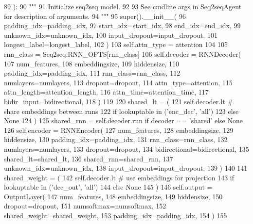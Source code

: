 \begin{DoxyCode}
89     ):
90         \textcolor{stringliteral}{"""}
91 \textcolor{stringliteral}{        Initialize seq2seq model.}
92 \textcolor{stringliteral}{}
93 \textcolor{stringliteral}{        See cmdline args in Seq2seqAgent for description of arguments.}
94 \textcolor{stringliteral}{        """}
95         super().\_\_init\_\_(
96             padding\_idx=padding\_idx,
97             start\_idx=start\_idx,
98             end\_idx=end\_idx,
99             unknown\_idx=unknown\_idx,
100             input\_dropout=input\_dropout,
101             longest\_label=longest\_label,
102         )
103         self.attn\_type = attention
104 
105         rnn\_class = Seq2seq.RNN\_OPTS[rnn\_class]
106         self.decoder = RNNDecoder(
107             num\_features,
108             embeddingsize,
109             hiddensize,
110             padding\_idx=padding\_idx,
111             rnn\_class=rnn\_class,
112             numlayers=numlayers,
113             dropout=dropout,
114             attn\_type=attention,
115             attn\_length=attention\_length,
116             attn\_time=attention\_time,
117             bidir\_input=bidirectional,
118         )
119 
120         shared\_lt = (
121             self.decoder.lt  \textcolor{comment}{# share embeddings between rnns}
122             \textcolor{keywordflow}{if} lookuptable \textcolor{keywordflow}{in} (\textcolor{stringliteral}{'enc\_dec'}, \textcolor{stringliteral}{'all'})
123             \textcolor{keywordflow}{else} \textcolor{keywordtype}{None}
124         )
125         shared\_rnn = self.decoder.rnn \textcolor{keywordflow}{if} decoder == \textcolor{stringliteral}{'shared'} \textcolor{keywordflow}{else} \textcolor{keywordtype}{None}
126         self.encoder = RNNEncoder(
127             num\_features,
128             embeddingsize,
129             hiddensize,
130             padding\_idx=padding\_idx,
131             rnn\_class=rnn\_class,
132             numlayers=numlayers,
133             dropout=dropout,
134             bidirectional=bidirectional,
135             shared\_lt=shared\_lt,
136             shared\_rnn=shared\_rnn,
137             unknown\_idx=unknown\_idx,
138             input\_dropout=input\_dropout,
139         )
140 
141         shared\_weight = (
142             self.decoder.lt  \textcolor{comment}{# use embeddings for projection}
143             \textcolor{keywordflow}{if} lookuptable \textcolor{keywordflow}{in} (\textcolor{stringliteral}{'dec\_out'}, \textcolor{stringliteral}{'all'})
144             \textcolor{keywordflow}{else} \textcolor{keywordtype}{None}
145         )
146         self.output = OutputLayer(
147             num\_features,
148             embeddingsize,
149             hiddensize,
150             dropout=dropout,
151             numsoftmax=numsoftmax,
152             shared\_weight=shared\_weight,
153             padding\_idx=padding\_idx,
154         )
155 
\end{DoxyCode}


